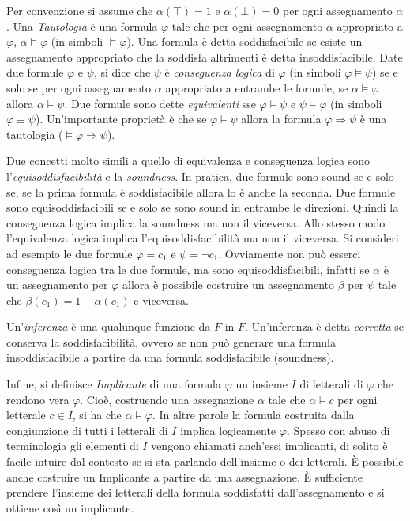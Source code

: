 \documentclass[./main.tex]{subfiles}
\begin{document}
Per convenzione si assume che $\alpha(\top) = 1$ e $\alpha(\bot) = 0$ per ogni assegnamento $\alpha$.
Una \textit{Tautologia} è una formula $\varphi$ tale che per ogni assegnamento $\alpha$ appropriato a $\varphi$, $\alpha \models \varphi$ (in simboli $\models \varphi$).
Una formula è detta soddisfacibile se esiste un assegnamento appropriato che la soddisfa altrimenti è detta insoddisfacibile.
Date due formule $\varphi$ e $\psi$, si dice che $\psi$ è \textit{conseguenza logica} di $\varphi$ (in simboli $\varphi \models \psi$) 
se e solo se per ogni assegnamento $\alpha$ appropriato a entrambe le formule, se $\alpha \models \varphi$ allora $\alpha \models \psi$.
Due formule sono dette \textit{equivalenti} sse $\varphi \models \psi$ e $\psi \models \varphi$ (in simboli $\varphi \equiv \psi$).
Un'importante proprietà è che se $\varphi \models \psi$ allora la formula $\varphi \Rightarrow \psi$ 
è una tautologia ($\models \varphi \Rightarrow \psi$).

Due concetti molto simili a quello di equivalenza e conseguenza logica sono l'\textit{equisoddisfacibilità} e la \textit{soundness}. In pratica, due formule sono sound
se e solo se, se la prima formula è soddisfacibile allora lo è anche la seconda. Due formule sono equisoddisfacibili se e solo se sono sound in entrambe le direzioni. 
Quindi la conseguenza logica implica la soundness ma non il viceversa. Allo stesso modo l'equivalenza
logica implica l'equisoddisfacibilità ma non il viceversa. Si consideri ad esempio le due formule $\varphi = c_1$ e $\psi = \lnot c_1$. Ovviamente non 
può esserci conseguenza logica tra le due formule, ma sono equisoddisfacibili, infatti se $\alpha$ è un assegnamento per $\varphi$ allora è possibile
costruire un assegnamento $\beta$ per $\psi$ tale che $\beta(c_1) = 1-\alpha(c_1)$ e viceversa.

Un'\textit{inferenza} è una qualunque funzione da $F$ in $F$. Un'inferenza è detta \textit{corretta} se conserva la soddisfacibilità, ovvero 
se non può generare una formula insoddisfacibile a partire da una formula soddisfacibile (soundness).

Infine, si definisce \textit{Implicante} di una formula $\varphi$ un insieme $I$ di letterali di $\varphi$ che rendono vera $\varphi$. Cioè, costruendo una
assegnazione $\alpha$ tale che $\alpha \models c$ per ogni letterale $c \in I$, si ha che $\alpha \models \varphi$. In altre parole la formula 
costruita dalla congiunzione di tutti i letterali di $I$ implica logicamente $\varphi$. Spesso con abuso di terminologia gli elementi di $I$ vengono chiamati
anch'essi implicanti, di solito è facile intuire dal contesto se si sta parlando dell'insieme o dei letterali.
È possibile anche costruire un Implicante a partire da una assegnazione. È sufficiente prendere l'insieme dei letterali della formula soddisfatti dall'assegnamento e 
si ottiene così un implicante.
\end{document}
